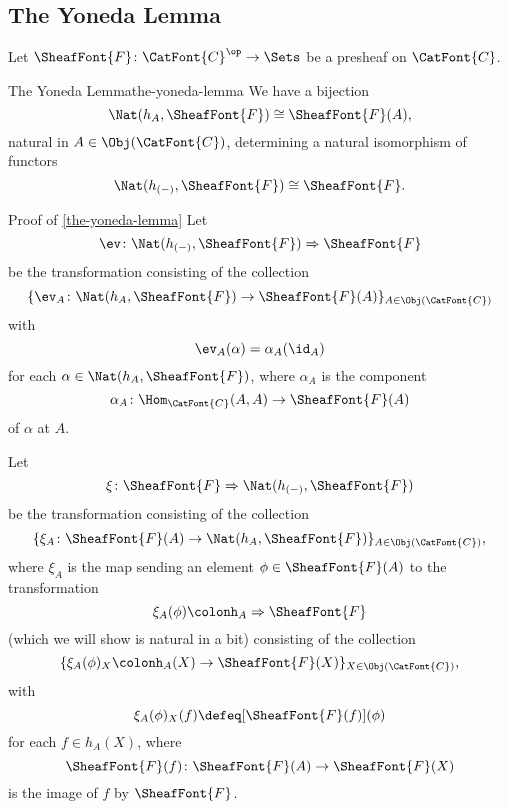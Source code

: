 \subsection{The Yoneda Lemma}\label{subsection-the-yoneda-lemma}
Let $\SheafFont{F}\colon\smash{\CatFont{C}^{\op}}\to\Sets$ be a presheaf on $\CatFont{C}$.
\begin{theorem}{The Yoneda Lemma}{the-yoneda-lemma}%
    We have a bijection
    \[
        \Nat(h_{A},\SheafFont{F})
        \cong
        \SheafFont{F}(A),
    \]%
    natural in $A\in\Obj(\CatFont{C})$, determining a natural isomorphism of functors
    \[
        \Nat(h_{(-)},\SheafFont{F})
        \cong
        \SheafFont{F}.
    \]%
\end{theorem}
\begin{Proof}{Proof of \cref{the-yoneda-lemma}}%
    Let
    \[
        \ev%
        \colon%
        \Nat(h_{(-)},\SheafFont{F})%
        \Rightarrow%
        \SheafFont{F}
    \]%
    be the transformation consisting of the collection
    \[
        \{%
            \ev_{A}%
            \colon%
            \Nat(h_{A},\SheafFont{F})%
            \to%
            \SheafFont{F}(A)%
        \}_{A\in\Obj(\CatFont{C})}%
    \]%
    with
    \[
        \ev_{A}(\alpha)%
        =%
        \alpha_{A}(\id_{A})%
    \]%
    for each $\alpha\in\Nat(h_{A},\SheafFont{F})$, where $\alpha_{A}$ is the component
    \[
        \alpha_{A}%
        \colon%
        \Hom_{\CatFont{C}}(A,A)%
        \to%
        \SheafFont{F}(A)%
    \]%
    of $\alpha$ at $A$.

    Let
    \[
        \xi%
        \colon%
        \SheafFont{F}%
        \Rightarrow%
        \Nat(h_{(-)},\SheafFont{F})%
    \]%
    be the transformation consisting of the collection
    \[
        \{%
            \xi_{A}%
            \colon%
            \SheafFont{F}(A)%
            \to%
            \Nat(h_{A},\SheafFont{F})%
        \}_{A\in\Obj(\CatFont{C})},%
    \]
    where $\xi_{A}$ is the map sending an element $\phi\in\SheafFont{F}(A)$ to the transformation
    \[%
        \xi_{A}(\phi)%
        \colon%
        h_{A}%
        \Rightarrow%
        \SheafFont{F}%
    \]
    (which we will show is natural in a bit) consisting of the collection
    \[%
        \{
            \xi_{A}(\phi)_{X}%
            \colon%
            h_{A}(X)%
            \to%
            \SheafFont{F}(X)%
        \}_{X\in\Obj(\CatFont{C})},%
    \]%
    with
    \[
        \xi_{A}(\phi)_{X}(f)%
        \defeq%
        [\SheafFont{F}(f)](\phi)%
    \]%
    for each $f\in h_{A}(X)$, where
    \[
        \SheafFont{F}(f)%
        \colon%
        \SheafFont{F}(A)%
        \to%
        \SheafFont{F}(X)%
    \]%
    is the image of $f$ by $\SheafFont{F}$.


\end{Proof}
